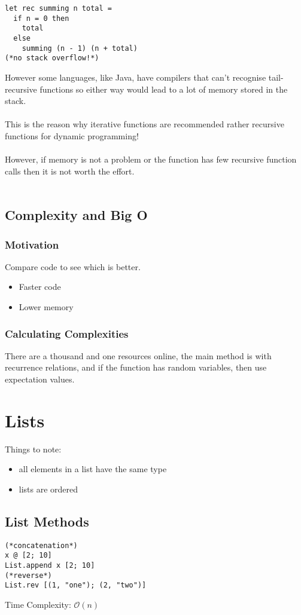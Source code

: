 \documentclass[12pt,a4paper]{article} %
\begin{document}
\begin{itemize}
\begin{lstlisting}[language=caml]
let rec summing n total =
  if n = 0 then
    total
  else
    summing (n - 1) (n + total)
(*no stack overflow!*)
\end{lstlisting}
However some languages, like Java, have compilers that can't recognise tail-recursive functions so either way would lead to a lot of memory stored in the stack.
\\\\
This is the reason why iterative functions are recommended rather recursive functions for dynamic programming!
\\\\
However, if memory is not a problem or the function has few recursive function calls then it is not worth the effort.
\\\\
\end{itemize}
\subsection{Complexity and Big O}
\subsubsection{Motivation}
Compare code to see which is better.
\begin{itemize}
\item Faster code
\item Lower memory
\end{itemize}
\subsubsection{Calculating Complexities}
There are a thousand and one resources online, the main method is with recurrence relations, and if the function has random variables, then use expectation values.
\section{Lists}
Things to note:
\begin{itemize}
\item all elements in a list have the same type
\item lists are ordered
\end{itemize}
\subsection{List Methods}
\begin{lstlisting}[language=caml]
(*concatenation*)
x @ [2; 10]
List.append x [2; 10] 
(*reverse*)
List.rev [(1, "one"); (2, "two")]
\end{lstlisting}
Time Complexity: $\mathcal{O}(n)$
\end{document}
